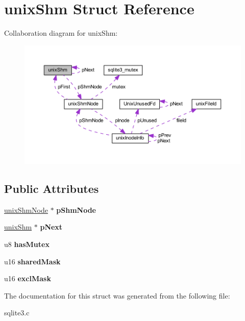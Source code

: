 \hypertarget{structunix_shm}{\section{unix\-Shm Struct Reference}
\label{structunix_shm}
}


Collaboration diagram for unix\-Shm\-:\nopagebreak
\begin{figure}[H]
\begin{center}
\leavevmode
\includegraphics[width=350pt]{structunix_shm__coll__graph}
\end{center}
\end{figure}
\subsection*{Public Attributes}
\begin{DoxyCompactItemize}
\item 
\hypertarget{structunix_shm_a8ab421232d29e3237262ef46775199ee}{\hyperlink{structunix_shm_node}{unix\-Shm\-Node} $\ast$ {\bfseries p\-Shm\-Node}}\label{structunix_shm_a8ab421232d29e3237262ef46775199ee}

\item 
\hypertarget{structunix_shm_a0d5229cf734581f51cdf16dd7d5ce93a}{\hyperlink{structunix_shm}{unix\-Shm} $\ast$ {\bfseries p\-Next}}\label{structunix_shm_a0d5229cf734581f51cdf16dd7d5ce93a}

\item 
\hypertarget{structunix_shm_a43903be262472299c5eee917ba7c523c}{u8 {\bfseries has\-Mutex}}\label{structunix_shm_a43903be262472299c5eee917ba7c523c}

\item 
\hypertarget{structunix_shm_a768aa62a6ea2bd91ab60a34d7654811b}{u16 {\bfseries shared\-Mask}}\label{structunix_shm_a768aa62a6ea2bd91ab60a34d7654811b}

\item 
\hypertarget{structunix_shm_ac6f786d95952e51cab941cbfb9243c8e}{u16 {\bfseries excl\-Mask}}\label{structunix_shm_ac6f786d95952e51cab941cbfb9243c8e}

\end{DoxyCompactItemize}


The documentation for this struct was generated from the following file\-:\begin{DoxyCompactItemize}
\item 
sqlite3.\-c\end{DoxyCompactItemize}
